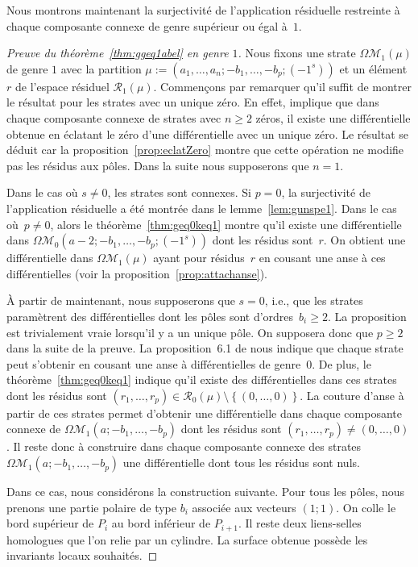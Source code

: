 \documentclass[11pt]{article}
\newcommand{\ie}{i.e.,\xspace}
\numberwithin{equation}{section}\renewcommand{\proofname}{Démonstration}
\let\mathcal\mathscr
\newcommand{\espres}[1][g]{\mathcal{R}_{#1}}
\newcommand{\omoduli}[1][g]{{\Omega\mathcal M}_{\!#1}}
\theoremstyle{definition}
\begin{document}
Nous montrons maintenant la surjectivité de l'application résiduelle restreinte à chaque composante connexe de genre supérieur ou égal à~$1$.
\begin{proof}[Preuve du théorème~\ref{thm:ggeq1abel} en genre $1$]
Nous fixons une strate $\omoduli[1](\mu)$ de genre $1$ avec la partition $\mu:=(a_{1},\dots,a_{n};-b_{1},\dots,-b_{p};(-1^{s}))$ et un élément $r$ de l'espace résiduel $\espres[1](\mu)$.
Commençons par remarquer qu'il suffit de montrer le résultat pour les strates avec un unique zéro. En effet, \cite[Prop.\,7.1]{Bo} implique que dans chaque composante connexe de strates avec $n\geq2$ zéros, il existe une différentielle obtenue en éclatant le zéro d'une différentielle avec un unique zéro. Le résultat se déduit car la proposition~\ref{prop:eclatZero} montre que cette opération ne modifie pas les résidus aux pôles. Dans la suite nous supposerons que $n=1$.

Dans le cas où $s\neq0$, les strates sont connexes. Si $p = 0$, la surjectivité de l'application résiduelle a été montrée dans le lemme~\ref{lem:gunspe1}.
Dans le cas où~$p\neq0$, alors le théorème~\ref{thm:geq0keq1} montre qu'il existe une différentielle dans $\omoduli[0](a-2;-b_{1},\dots,-b_{p};(-1^{s}))$ dont les résidus sont~$r$. On obtient une différentielle dans $\omoduli[1](\mu)$ ayant pour résidus~$r$ en cousant une anse à ces différentielles (voir la proposition~\ref{prop:attachanse}).

À partir de maintenant, nous supposerons que $s=0$, \ie que les strates paramètrent des différentielles dont les pôles sont d'ordres~$b_{i}\geq 2$. La proposition est trivialement vraie lorsqu'il y a un unique pôle. On supposera donc que $p\geq2$ dans la suite de la preuve. La proposition~6.1 de \cite{Bo} nous indique que chaque strate peut s'obtenir en cousant une anse à différentielles de genre~$0$. De plus, le théorème~\ref{thm:geq0keq1} indique qu'il existe des différentielles dans ces strates dont les résidus sont $(r_{1},\dots,r_{p})\in \espres[0](\mu)\setminus\left\{(0,\dots,0)\right\}$. La couture d'anse à partir de ces strates permet d'obtenir une différentielle dans chaque composante connexe de $\omoduli[1](a;-b_{1},\dots,-b_{p})$ dont les résidus sont $(r_{1},\dots,r_{p}) \neq (0,\dots,0)$. Il reste donc à construire dans chaque composante connexe des strates $\omoduli[1](a;-b_{1},\dots,-b_{p})$ une différentielle dont tous les résidus sont nuls.

Dans ce cas, nous considérons la construction suivante. Pour tous les pôles, nous prenons une partie polaire de type $b_{i}$ associée aux vecteurs $(1;1)$. On colle le bord supérieur de $P_{i}$ au bord inférieur de $P_{i+1}$.
Il reste deux liens-selles homologues que l'on relie par un cylindre. La surface obtenue possède les invariants locaux souhaités.


\end{proof}
\end{document}
